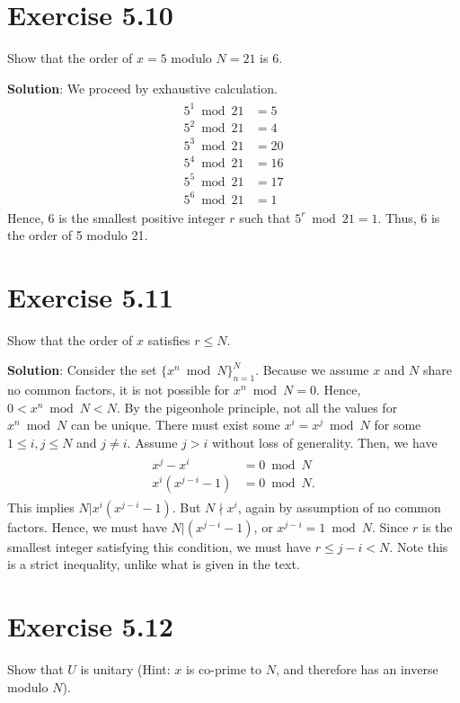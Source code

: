 \documentclass{book}
\begin{document}
\section*{Exercise 5.10}
    Show that the order of $x=5$ modulo $N=21$ is 6.
    
    \textbf{Solution}: We proceed by exhaustive calculation.
    \begin{align}
    \begin{aligned}
        5^1 \bmod 21 &= 5 \\
        5^2 \bmod 21 &= 4 \\
        5^3 \bmod 21 &= 20\\
        5^4 \bmod 21 &= 16\\
        5^5 \bmod 21 &= 17\\
        5^6 \bmod 21 &= 1
    \end{aligned}
    \end{align}
    Hence, 6 is the smallest positive integer $r$ such that $5^r \bmod 21 = 1$. Thus, 6 is the order of 5 modulo 21.

\section*{Exercise 5.11}
    Show that the order of $x$ satisfies $r\leq N$.
    
    \textbf{Solution}: Consider the set $\{x^n \bmod N\}_{n=1}^N$. Because we assume $x$ and $N$ share no common factors, it is not possible for $x^n \bmod N = 0$. Hence, $0< x^n \bmod N < N$. By the pigeonhole principle, not all the values for $x^n \bmod N$ can be unique. There must exist some $x^i = x^j \bmod N$ for some $1\leq i,j \leq N$ and $j\neq i$. Assume $j>i$ without loss of generality. Then, we have
    \begin{align}
    \begin{aligned}
        x^j-x^i &= 0 \bmod N \\
        x^i(x^{j-i}-1) &=0 \bmod N.
    \end{aligned}
    \end{align}
    This implies $N|x^i(x^{j-i}-1)$. But $N\nmid x^i$, again by assumption of no common factors. Hence, we must have $N|(x^{j-i}-1)$, or $x^{j-i} = 1 \bmod N$. Since $r$ is the smallest integer satisfying this condition, we must have $r\leq j-i < N$. Note this is a strict inequality, unlike what is given in the text.

\section*{Exercise 5.12}
    Show that $U$ is unitary (Hint: $x$ is co-prime to $N$, and therefore has an inverse modulo $N$).
    
\end{document}
